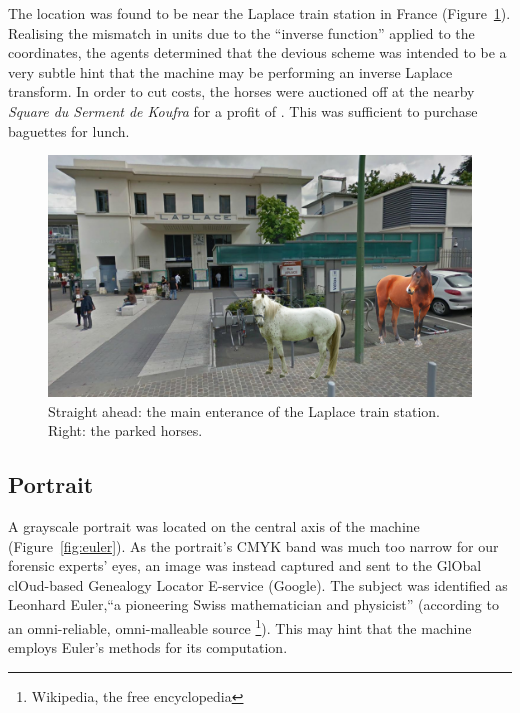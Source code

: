 The location was found to be near the Laplace train station in France (Figure~\ref{fig:laplace-horses}). Realising the mismatch in units due to the ``inverse function'' applied to the coordinates, the agents determined that the devious scheme was intended to be a very subtle hint that the machine may be performing an inverse Laplace transform. In order to cut costs, the horses were auctioned off at the nearby \emph{Square du Serment de Koufra} for a profit of . This was sufficient to purchase baguettes for lunch.

\begin{figure}[h]
	\centering
	\includegraphics[width=0.95\columnwidth]{img/laplace-horses.jpg}
	\caption{Straight ahead: the main enterance of the Laplace train station. Right: the parked horses.}
	\label{fig:laplace-horses}
\end{figure}



\subsection{Portrait}
\newcommand{\google}{\textcolor{google-blue}{G}\textcolor{google-red}{o}\textcolor{google-yellow}{o}\textcolor{google-blue}{g}\textcolor{google-green}{l}\textcolor{google-red}{e}}

A grayscale portrait was located on the central axis of the machine (Figure~\ref{fig:euler}). As the portrait's CMYK band was much too narrow for our forensic experts' eyes, an image was instead captured and sent to the \textcolor{google-blue}{G}l\textcolor{google-red}{O}bal cl\textcolor{google-yellow}{O}ud-based \textcolor{google-blue}{G}enealogy \textcolor{google-green}{L}ocator \textcolor{google-red}{E}-service (\google). The subject was identified as Leonhard Euler,``a pioneering Swiss mathematician and physicist'' (according to an omni-reliable, omni-malleable source \footnote{Wikipedia, the free encyclopedia}). This may hint that the machine employs Euler's methods for its computation.

